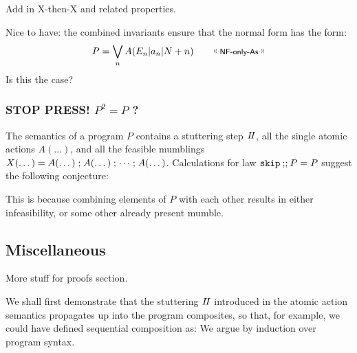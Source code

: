 Add in X-then-X and related properties.

Nice to have:
the combined invariants ensure that the normal form
has the form:
\[
  P = \bigvee_n A(E_n|a_n|N+n)  \qquad \elabel{NF-only-As}
\]
Is this the case?

\subsubsection{STOP PRESS! $P^2=P$ ?}

The semantics of a program $P$
contains a stuttering step $I\!I$,
all the single atomic actions $A(\dots)$,
and all the feasible mumblings
$X(\dots) = A(\dots) \seq A(\dots) \seq \dots \seq A(\dots)$.
Calculations for law $\texttt{skip}\mathbin{;\!;} P = P$ suggest the following conjecture:
\begin{center}
\end{center}
This is because combining elements of $P$ with each other results
in either infeasibility, or some other already present mumble.

\newpage
\subsection{Miscellaneous}

More stuff for proofs section.


We shall first demonstrate that the stuttering $I\!I$
introduced in the atomic action semantics
propagates up into the program composites,
so that, for example, we could have defined sequential composition
as:
We argue by induction over program syntax.

